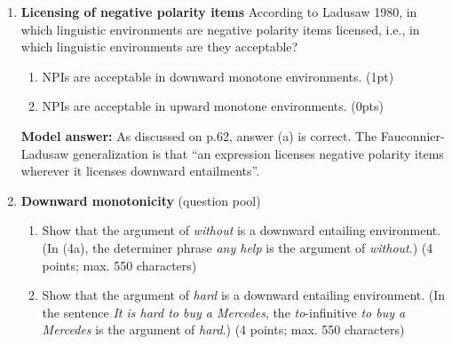 \documentclass[a4,11pt]{article}
\begin{document}
\begin{enumerate}[leftmargin = 12pt]
      \begin{enumerate}[noitemsep]
        \item Left downward monotone (1pt checked / -1pt unchecked)
        \item Right downward monotone (-1pt checked / 1pt unchecked)
        \item Not downward monotone (-1pt checked / 1pt unchecked)
	\end{enumerate}	
	

{\bf Model answer:} The correct answer is left downward monotone. If \textit{All dogs love walks} is true, then it means that \textit{all chihuahuas love walks} is also true. Since chihuahuas is a subset of dogs, \textit{all} is left downward monotone. If \textit{All dogs love walks} is true, it does not entail that \textit{all dogs love walks in a park} is true. Some dogs might prefer walks in a city center. Therefore, \textit{all} is not right downward monotone.

\item {\bf Licensing of negative polarity items} According to Ladusaw 1980, in which linguistic environments are negative polarity items licensed, i.e., in which linguistic environments are they acceptable?  

  \begin{enumerate}[noitemsep]
        \item NPIs are acceptable in downward monotone environments. (1pt)
        \item NPIs are acceptable in upward monotone environments. (0pts)
	\end{enumerate}

{\bf Model answer:} As discussed on p.62, answer (a) is correct. The Fauconnier-Ladusaw generalization is that ``an expression licenses negative polarity items wherever it licenses downward entailments''.

\item {\bf Downward monotonicity} (question pool)

\begin{enumerate}[noitemsep]

\item Show that the argument of \textit{without} is a downward entailing environment. (In (4a), the determiner phrase \textit{any help} is the argument of \textit{without}.) (4 points; max. 550 characters)

\item Show that the argument of \textit{hard} is a downward entailing environment. (In the sentence \textit{It is hard to buy a Mercedes}, the \textit{to}-infinitive \textit{to buy a Mercedes} is the argument of \textit{hard}.) (4 points; max. 550 characters)


\end{enumerate}
\end{enumerate}
\end{document}
